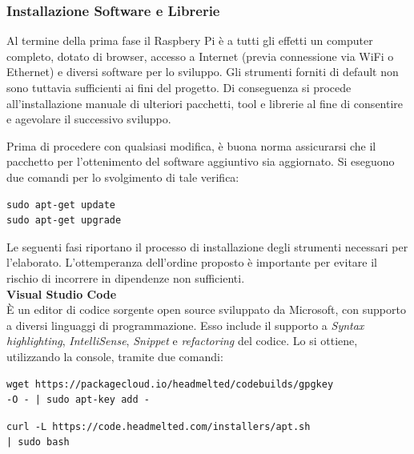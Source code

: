 \documentclass[12pt]{article}
\begin{document}
\subsubsection{Installazione Software e Librerie}

Al termine della prima fase il Raspbery Pi è a tutti gli effetti un computer completo, dotato di browser, accesso a Internet (previa connessione via WiFi o Ethernet) e diversi software per lo sviluppo. Gli strumenti forniti di default non sono tuttavia sufficienti ai fini del progetto. Di conseguenza si procede all'installazione manuale di ulteriori pacchetti, tool e librerie al fine di consentire e agevolare il successivo sviluppo.

Prima di procedere con qualsiasi modifica, è buona norma assicurarsi che il pacchetto per l'ottenimento del software aggiuntivo sia aggiornato. Si eseguono due comandi per lo svolgimento di tale verifica:
\begin{lstlisting}
sudo apt-get update
sudo apt-get upgrade
\end{lstlisting}

Le seguenti fasi riportano il processo di installazione degli strumenti necessari per l'elaborato. L'ottemperanza dell'ordine proposto è importante per evitare il rischio di incorrere in dipendenze non sufficienti.\\

\textbf{Visual Studio Code}\\
È un editor di codice sorgente open source sviluppato da Microsoft, con supporto a diversi linguaggi di programmazione. Esso include il supporto a \textit{Syntax highlighting}, \textit{IntelliSense}, \textit{Snippet} e \textit{refactoring} del codice. Lo si ottiene, utilizzando la console, tramite due comandi:
\begin{lstlisting}
wget https://packagecloud.io/headmelted/codebuilds/gpgkey 
-O - | sudo apt-key add -
\end{lstlisting}
\begin{lstlisting}
curl -L https://code.headmelted.com/installers/apt.sh
| sudo bash
\end{lstlisting}
\end{document}
